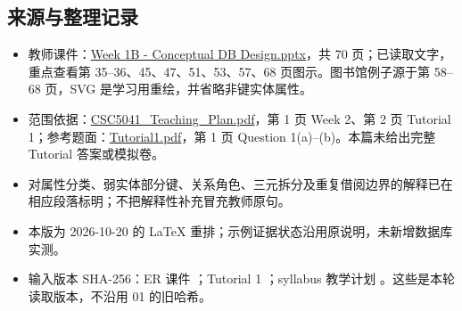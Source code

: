 \subsection{来源与整理记录}\label{02_er_modelling_zh-ux6765ux6e90ux4e0eux6574ux7406ux8bb0ux5f55}

\begin{itemize}
\tightlist
\item
  教师课件：\href{../../../slides/Week\%201B\%20-\%20Conceptual\%20DB\%20Design.pptx}{Week 1B - Conceptual DB Design.pptx}，共 70 页；已读取文字，重点查看第 35--36、45、47、51、53、57、68 页图示。图书馆例子源于第 58--68 页，SVG 是学习用重绘，并省略非键实体属性。
\item
  范围依据：\href{../../../syllabus/CSC5041_Teaching_Plan.pdf}{CSC5041\_Teaching\_Plan.pdf}，第 1 页 Week 2、第 2 页 Tutorial 1；参考题面：\href{../../../slides/Tutorial1.pdf}{Tutorial1.pdf}，第 1 页 Question 1(a)--(b)。本篇未给出完整 Tutorial 答案或模拟卷。
\item
  对属性分类、弱实体部分键、关系角色、三元拆分及重复借阅边界的解释已在相应段落标明；不把解释性补充冒充教师原句。
\item
  本版为 2026-10-20 的 LaTeX 重排；示例证据状态沿用原说明，未新增数据库实测。
\item
  输入版本 SHA-256：ER 课件 \texttt{}；Tutorial 1 \texttt{}；syllabus 教学计划 \texttt{}。这些是本轮读取版本，不沿用 01 的旧哈希。
\end{itemize}
